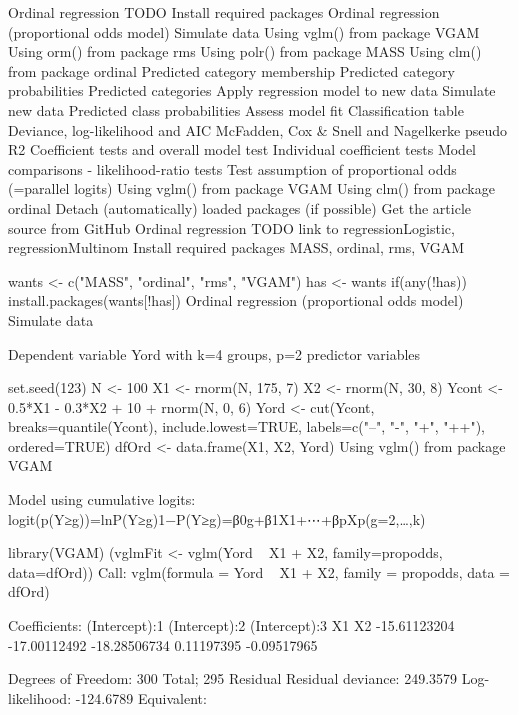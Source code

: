 

Ordinal regression
TODO
Install required packages
Ordinal regression (proportional odds model)
Simulate data
Using vglm() from package VGAM
Using orm() from package rms
Using polr() from package MASS
Using clm() from package ordinal
Predicted category membership
Predicted category probabilities
Predicted categories
Apply regression model to new data
Simulate new data
Predicted class probabilities
Assess model fit
Classification table
Deviance, log-likelihood and AIC
McFadden, Cox & Snell and Nagelkerke pseudo R2
Coefficient tests and overall model test
Individual coefficient tests
Model comparisons - likelihood-ratio tests
Test assumption of proportional odds (=parallel logits)
Using vglm() from package VGAM
Using clm() from package ordinal
Detach (automatically) loaded packages (if possible)
Get the article source from GitHub
Ordinal regression
TODO
link to regressionLogistic, regressionMultinom
Install required packages
MASS, ordinal, rms, VGAM

wants <- c("MASS", "ordinal", "rms", "VGAM")
has   <- wants %
if(any(!has)) install.packages(wants[!has])
Ordinal regression (proportional odds model)
Simulate data

Dependent variable Yord with k=4 groups, p=2 predictor variables

set.seed(123)
N     <- 100
X1    <- rnorm(N, 175, 7)
X2    <- rnorm(N,  30, 8)
Ycont <- 0.5*X1 - 0.3*X2 + 10 + rnorm(N, 0, 6)
Yord  <- cut(Ycont, breaks=quantile(Ycont), include.lowest=TRUE,
             labels=c("--", "-", "+", "++"), ordered=TRUE)
dfOrd <- data.frame(X1, X2, Yord)
Using vglm() from package VGAM

Model using cumulative logits: logit(p(Y≥g))=lnP(Y≥g)1−P(Y≥g)=β0g+β1X1+⋯+βpXp(g=2,…,k)

library(VGAM)
(vglmFit <- vglm(Yord ~ X1 + X2, family=propodds, data=dfOrd))
Call:
vglm(formula = Yord ~ X1 + X2, family = propodds, data = dfOrd)

Coefficients:
(Intercept):1 (Intercept):2 (Intercept):3            X1            X2 
 -15.61123204  -17.00112492  -18.28506734    0.11197395   -0.09517965 

Degrees of Freedom: 300 Total; 295 Residual
Residual deviance: 249.3579 
Log-likelihood: -124.6789 
Equivalent:

